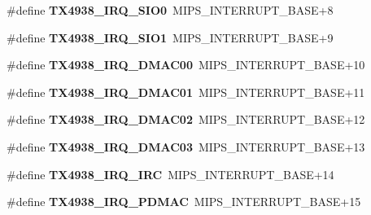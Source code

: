 \begin{DoxyCompactItemize}
\mbox{\label{group__bsp__interrupt_gae05aae2521b1209097964c38b1f434df}} 
\#define {\bfseries T\+X4938\+\_\+\+I\+R\+Q\+\_\+\+S\+I\+O0}~M\+I\+P\+S\+\_\+\+I\+N\+T\+E\+R\+R\+U\+P\+T\+\_\+\+B\+A\+SE+8
\item 
\mbox{\label{group__bsp__interrupt_ga85f1d4cefef612d7a2930c7beb92bc9a}} 
\#define {\bfseries T\+X4938\+\_\+\+I\+R\+Q\+\_\+\+S\+I\+O1}~M\+I\+P\+S\+\_\+\+I\+N\+T\+E\+R\+R\+U\+P\+T\+\_\+\+B\+A\+SE+9
\item 
\mbox{\label{group__bsp__interrupt_ga9935f66c500a81d5834bc527b14a4387}} 
\#define {\bfseries T\+X4938\+\_\+\+I\+R\+Q\+\_\+\+D\+M\+A\+C00}~M\+I\+P\+S\+\_\+\+I\+N\+T\+E\+R\+R\+U\+P\+T\+\_\+\+B\+A\+SE+10
\item 
\mbox{\label{group__bsp__interrupt_gae7a955c69f04a27c8b4babcc6543a2f1}} 
\#define {\bfseries T\+X4938\+\_\+\+I\+R\+Q\+\_\+\+D\+M\+A\+C01}~M\+I\+P\+S\+\_\+\+I\+N\+T\+E\+R\+R\+U\+P\+T\+\_\+\+B\+A\+SE+11
\item 
\mbox{\label{group__bsp__interrupt_gacc77bce2563a22c85db295d88818480a}} 
\#define {\bfseries T\+X4938\+\_\+\+I\+R\+Q\+\_\+\+D\+M\+A\+C02}~M\+I\+P\+S\+\_\+\+I\+N\+T\+E\+R\+R\+U\+P\+T\+\_\+\+B\+A\+SE+12
\item 
\mbox{\label{group__bsp__interrupt_ga8e0e5be413aaf54d1f7aa801e3b85b9d}} 
\#define {\bfseries T\+X4938\+\_\+\+I\+R\+Q\+\_\+\+D\+M\+A\+C03}~M\+I\+P\+S\+\_\+\+I\+N\+T\+E\+R\+R\+U\+P\+T\+\_\+\+B\+A\+SE+13
\item 
\mbox{\label{group__bsp__interrupt_gaf52dae0f1743009a0488643db361ea14}} 
\#define {\bfseries T\+X4938\+\_\+\+I\+R\+Q\+\_\+\+I\+RC}~M\+I\+P\+S\+\_\+\+I\+N\+T\+E\+R\+R\+U\+P\+T\+\_\+\+B\+A\+SE+14
\item 
\mbox{\label{group__bsp__interrupt_ga98757c1f95808604b133661095161259}} 
\#define {\bfseries T\+X4938\+\_\+\+I\+R\+Q\+\_\+\+P\+D\+M\+AC}~M\+I\+P\+S\+\_\+\+I\+N\+T\+E\+R\+R\+U\+P\+T\+\_\+\+B\+A\+SE+15
\item 
\mbox{\label{group__bsp__interrupt_ga3b654105d58129d5f8d5047f08ac5f4f}} 

\end{DoxyCompactItemize}
